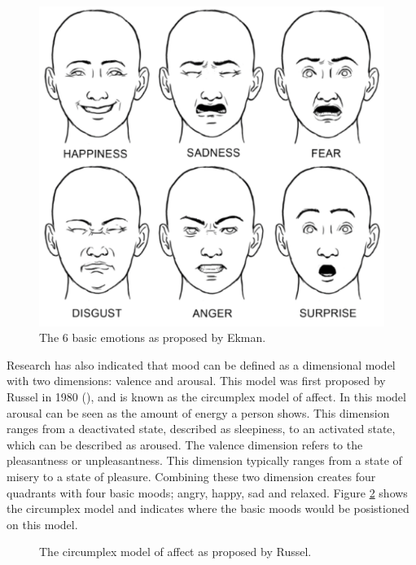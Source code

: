 \begin{figure}[h]
  \centering
  \includegraphics[width=\columnwidth]{Images/ekman_six_emotion.png}
  \caption{The 6 basic emotions as proposed by Ekman.}
  \label{fig:basicemotion}
\end{figure}

Research has also indicated that mood can be defined as a dimensional model with two dimensions: valence and arousal. This model was first proposed by Russel in 1980 (\cite{russell1980circumplex}), and is known as the circumplex model of affect. In this model arousal can be seen as the amount of energy a person shows. This dimension ranges from a deactivated state, described as sleepiness, to an activated state, which can be described as aroused. The valence dimension refers to the pleasantness or unpleasantness. This dimension typically ranges from a state of misery to a state of pleasure. Combining these two dimension creates four quadrants with four basic moods; angry, happy, sad and relaxed. Figure \ref{fig:circumplexrussel} shows the circumplex model and indicates where the basic moods would be posistioned on this model. 

\begin{figure}[h]
  \centering
  
  \caption{The circumplex model of affect as proposed by Russel.}
  \label{fig:circumplexrussel}
\end{figure}

